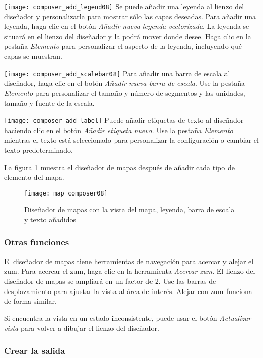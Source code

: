 \texttt{[image: composer\_add\_legend08]} Se puede añadir una leyenda al lienzo del diseñador y personalizarla para mostrar sólo las capas deseadas. Para añadir una leyenda, haga clic en el botón \textit{Añadir nueva leyenda vectorizada}. La leyenda se situará en el lienzo del diseñador y la podrá mover donde desee. Haga clic en la pestaña \textit{Elemento} para personalizar el aspecto de la leyenda, incluyendo qué capas se muestran.

\texttt{[image: composer\_add\_scalebar08]} Para añadir una barra de escala al diseñador, haga clic en el botón \textit{Añadir nueva barra de escala}. Use
la pestaña \textit{Elemento} para personalizar el tamaño y número de segmentos y las unidades, tamaño y fuente de la escala.

\texttt{[image: composer\_add\_label]} Puede añadir etiquetas de texto al diseñador haciendo clic en el botón \textit{Añadir etiqueta nueva}. Use la pestaña \textit{Elemento} mientras el texto está seleccionado para personalizar la configuración o cambiar el texto predeterminado.

La figura \ref{fig:map_composer_complete} muestra el diseñador de mapas después de añadir cada tipo de elemento del mapa.
\begin{figure}[h]
   \begin{center}
   \caption{Diseñador de mapas con la vista del mapa, leyenda, barra de escala y texto añadidos}\label{fig:map_composer_complete}\smallskip
   \texttt{[image: map\_composer08]}
\end{center}  
\end{figure}

\subsubsection{Otras funciones}

El diseñador de mapas tiene herramientas de navegación para acercar y alejar el zum. Para acercar el zum, haga clic en la herramienta \textit{Acercar zum}. El lienzo del diseñador de mapas se ampliará en un factor de 2. Use las barras de desplazamiento para ajustar la vista al área de interés. Alejar con zum funciona de forma similar.

Si encuentra la vista en un estado inconsistente, puede usar el botón \textit{Actualizar vista} para volver a dibujar el lienzo del diseñador.

\subsubsection{Crear la salida}


